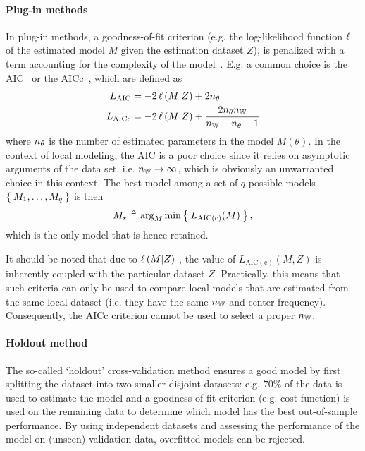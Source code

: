 \paragraph{Plug-in methods}
In plug-in methods, a goodness-of-fit criterion (e.g. the log-likelihood function $\operatorname{\ell}$ of the estimated model $M$ given the estimation dataset $Z$), is penalized with a term accounting for the complexity of the model~\citep{Burnham2002}.
E.g. a common choice is the \gls{AIC}~\citep{Akaike1974} or the \gls{AICc}~\citep{Hurvich1989}, which are defined as
\begin{align}
L_{\mathrm{\mathrm{AIC}}} &=
 - 2  \operatorname{\ell}\left( M | Z \right)  
 + 2 n_{\theta}\\
L_{\mathrm{\mathrm{AICc}}} &= 
- 2  \operatorname{\ell}\left( M | Z \right)  
+   \frac{2 n_{\theta}n_{\mathbb{W}}}{n_{\mathbb{W}} - n_{\theta} - 1}
\end{align}
where $n_{\theta}$ is the number of  estimated parameters in the model $M(\theta)$.
In the context of local modeling, the \gls{AIC} is a poor choice since it relies on asymptotic arguments of the data set, i.e. $n_{\mathbb{W}} \to \infty$, which is obviously an unwarranted choice in this context.
The best model among a set of $q$ possible models $\Set{M_1, \ldots, M_q}$ is then
\begin{equation}
  M_{\star} \triangleq 
  \arg_{M} \min 
  \Set{
    L_{\mathrm{AIC(c)}}(M)
  }
  \text{,}
\end{equation}
which is the only model that is hence retained.

\begin{remark}
It should be noted that due to $\operatorname{\ell}\left( M | Z \right) $ , the value of $L_{\mathrm{AIC(c)}}(M,Z)$ is inherently coupled with the particular dataset $Z$.
Practically, this means that such criteria can only be used to compare local models that are estimated from the same local dataset (i.e. they have the same $n_{\mathbb{W}}$ and center frequency).
Consequently, the \gls{AICc} criterion cannot be used to select a proper $n_{\mathbb{W}}$.
\end{remark}

\paragraph{Holdout method}
The so-called `holdout' cross-validation method ensures a good model by first splitting the dataset into two smaller disjoint datasets: e.g. $70\%$ of the data  is used to estimate the model and a goodness-of-fit criterion (e.g. cost function) is used on the remaining data to determine which model has the best out-of-sample performance.
By using independent datasets and assessing the performance of the model on (unseen) validation data, overfitted models can be rejected.


